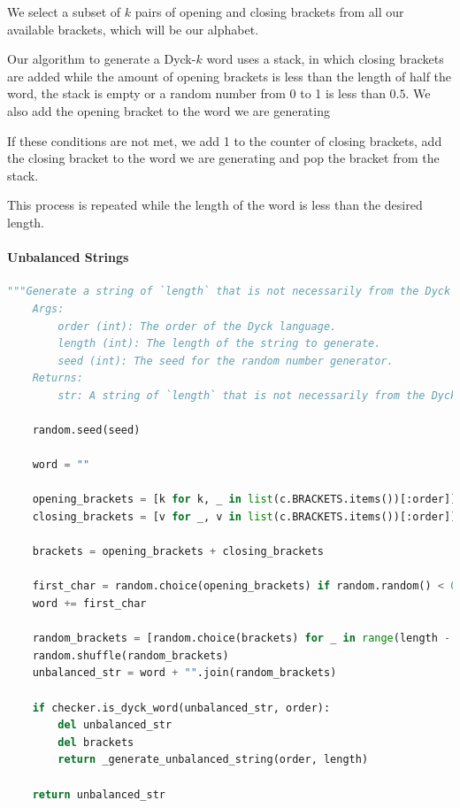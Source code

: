 We select a subset of $k$ pairs of opening and closing brackets from all our available brackets, which will be our alphabet.

Our algorithm to generate a Dyck-$k$ word uses a stack, in which closing brackets are added while the amount of opening brackets is less than the length of half the word, the stack is empty or a random number from 0 to 1 is less than $0.5$. We also add the opening bracket to the word we are generating

If these conditions are not met, we add 1 to the counter of closing brackets, add the closing bracket to the word we are generating and pop the bracket from the stack.

This process is repeated while the length of the word is less than the desired length.

\paragraph{Unbalanced Strings}
\begin{lstlisting}[language=Python, caption=Generate unbalanced string, label=code:unbalanced_generator]
    """Generate a string of `length` that is not necessarily from the Dyck language of `order`.
    Args:
        order (int): The order of the Dyck language.
        length (int): The length of the string to generate.
        seed (int): The seed for the random number generator.
    Returns:
        str: A string of `length` that is not necessarily from the Dyck language of `order`."""
    
    random.seed(seed)
    
    word = ""
    
    opening_brackets = [k for k, _ in list(c.BRACKETS.items())[:order]]
    closing_brackets = [v for _, v in list(c.BRACKETS.items())[:order]]
    
    brackets = opening_brackets + closing_brackets

    first_char = random.choice(opening_brackets) if random.random() < 0.5 else random.choice(closing_brackets)
    word += first_char

    random_brackets = [random.choice(brackets) for _ in range(length - 1)]
    random.shuffle(random_brackets)
    unbalanced_str = word + "".join(random_brackets)

    if checker.is_dyck_word(unbalanced_str, order):
        del unbalanced_str
        del brackets
        return _generate_unbalanced_string(order, length)

    return unbalanced_str
\end{lstlisting}

